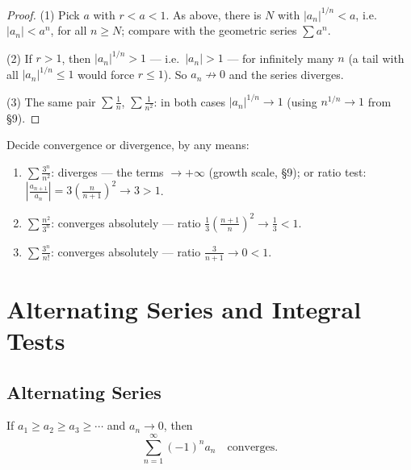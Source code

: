 \documentclass[11pt]{report}
\begin{document}
\begin{proof}
(1) Pick $a$ with $r < a < 1$. As above, there is $N$ with $|a_n|^{1/n} < a$, i.e.\ $|a_n| < a^n$, for all $n \geq N$; compare with the geometric series $\sum a^n$.

(2) If $r > 1$, then $|a_n|^{1/n} > 1$ --- i.e.\ $|a_n| > 1$ --- for infinitely many $n$ (a tail with all $|a_n|^{1/n} \leq 1$ would force $r \leq 1$). So $a_n \not\to 0$ and the series diverges.

(3) The same pair $\sum \tfrac1n$, $\sum \tfrac1{n^2}$: in both cases $|a_n|^{1/n} \to 1$ (using $n^{1/n} \to 1$ from \S 9).
\end{proof}

\begin{exbox}
Decide convergence or divergence, by any means:
\begin{enumerate}[label=(\arabic*)]
    \item $\displaystyle\sum \frac{3^n}{n^2}$: diverges --- the terms $\to +\infty$ (growth scale, \S 9); or ratio test: $\left|\tfrac{a_{n+1}}{a_n}\right| = 3 \left( \tfrac{n}{n+1} \right)^2 \to 3 > 1$.
    \item $\displaystyle\sum \frac{n^2}{3^n}$: converges absolutely --- ratio $\tfrac13 \left( \tfrac{n+1}{n} \right)^2 \to \tfrac13 < 1$.
    \item $\displaystyle\sum \frac{3^n}{n!}$: converges absolutely --- ratio $\tfrac{3}{n+1} \to 0 < 1$.
\end{enumerate}
\end{exbox}


\section{Alternating Series and Integral Tests}

\subsection{Alternating Series}

\begin{thmbox}
If $a_1 \geq a_2 \geq a_3 \geq \cdots$ and $a_n \to 0$, then
\[
\sum_{n=1}^{\infty} (-1)^n a_n \quad \text{converges.}
\]
\end{thmbox}
\end{document}

